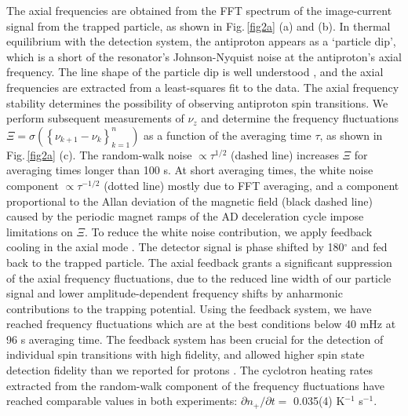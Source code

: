 \documentclass[12pt,preprint%
]{elsarticle}
\begin{document}
The axial frequencies are obtained from the FFT spectrum of the image-current signal from the trapped particle, as shown in Fig.$\,$\ref{fig2a} (a) and (b). In thermal equilibrium with the detection system, the antiproton appears as a `particle dip', which is a short of the resonator's Johnson-Nyquist noise at the antiproton's axial frequency. The line shape of the particle dip is well understood \cite{Wine}, and the axial frequencies are extracted from a least-squares fit to the data. The axial frequency stability determines the possibility of observing antiproton spin transitions. We perform subsequent measurements of $\nu_z$ and determine the frequency fluctuations $\Xi = \sigma(\left\{\nu_{k+1}-\nu_k\right\}_{k=1}^n)$ as a function of the averaging time $\tau$, as shown in Fig.$\,$\ref{fig2a} (c). The random-walk noise $\propto \tau^{1/2}$ (dashed line) increases $\Xi$ for averaging times longer than 100 s. At short averaging times, the white noise component $\propto \tau^{-1/2}$ (dotted line) mostly due to FFT averaging, and a component proportional to the Allan deviation of the magnetic field (black dashed line) caused by the periodic magnet ramps of the AD deceleration cycle impose limitations on $\Xi$. To reduce the white noise contribution, we apply feedback cooling in the axial mode \cite{CoolingMethods}. The detector signal is phase shifted by 180$^\circ$ and fed back to the trapped particle. The axial feedback grants a significant suppression of the axial frequency fluctuations, due to the reduced line width of our particle signal \cite{HiroRSI2016} and lower amplitude-dependent frequency shifts \cite{DUrso2003} by anharmonic contributions to the trapping potential. Using the feedback system, we have reached frequency fluctuations which are at the best conditions below 40 mHz at 96 s averaging time. The feedback system has been crucial for the detection of individual spin transitions with high fidelity, and allowed higher spin state detection fidelity than we reported for protons \cite{MooserPLB2013}. The cyclotron heating rates extracted from the random-walk component of the frequency fluctuations have reached comparable values in both experiments: $\partial n_+/\partial t =$ 0.035(4) K$^{-1}$ s$^{-1}$.
\end{document}

